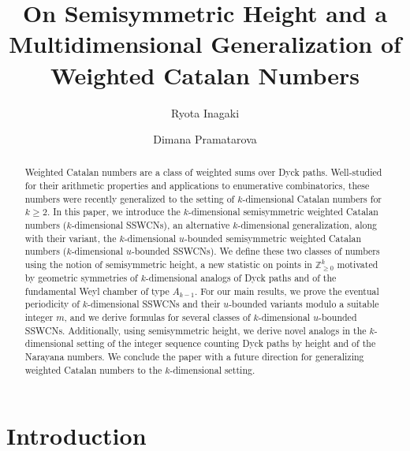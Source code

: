\documentclass[11pt]{article}
\title{On Semisymmetric Height and a Multidimensional Generalization of Weighted Catalan Numbers}
\author{Ryota Inagaki \and Dimana Pramatarova}
\theoremstyle{remark}
\theoremstyle{definition}
\begin{document}
\maketitle

\begin{abstract}
Weighted Catalan numbers are a class of weighted sums over Dyck paths. Well-studied for their arithmetic properties and applications to enumerative combinatorics, these numbers were recently generalized to the setting of $k$-dimensional Catalan numbers for $k \geq 2$. In this paper, we introduce the $k$-dimensional semisymmetric weighted Catalan numbers ($k$-dimensional SSWCNs), an alternative $k$-dimensional generalization, along with their variant, the $k$-dimensional $u$-bounded semisymmetric weighted Catalan numbers ($k$-dimensional $u$-bounded SSWCNs). We define these two classes of numbers using the notion of semisymmetric height, a new statistic on points in $\mathbb{Z}^k_{\geq 0}$ motivated by geometric symmetries of $k$-dimensional analogs of Dyck paths and of the fundamental Weyl chamber of type $A_{k-1}$. For our main results, we prove the eventual periodicity of $k$-dimensional SSWCNs and their $u$-bounded variants modulo a suitable integer $m$, and we derive formulas for several classes of $k$-dimensional $u$-bounded SSWCNs. Additionally, using semisymmetric height, we derive novel analogs in the $k$-dimensional setting of the integer sequence counting Dyck paths by height and of the Narayana numbers. We conclude the paper with a future direction for generalizing weighted Catalan numbers to the $k$-dimensional setting.
\end{abstract}
\renewcommand{\thefootnote}{\fnsymbol{footnote}} 



\maketitle 


\section{Introduction}
\label{section:intro}
\end{document}
